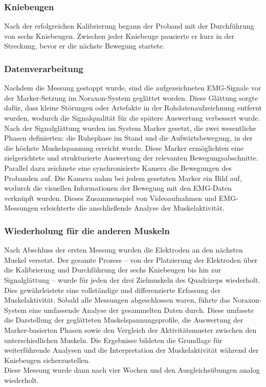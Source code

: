 \subsubsection{Kniebeugen}
Nach der erfolgreichen Kalibrierung begann der Proband mit der Durchführung von sechs Kniebeugen. Zwischen jeder Kniebeuge pausierte er kurz in der Streckung, bevor er die nächste Bewegung startete.
\subsubsection{Datenverarbeitung}
Nachdem die Messung gestoppt wurde, sind die aufgezeichneten EMG-Signale vor der Marker-Setzung im Noraxon-System geglättet worden. Diese Glättung sorgte dafür, dass kleine Störungen oder Artefakte in der Rohdatenaufzeichnung entfernt wurden, wodurch die Signalqualität für die spätere Auswertung verbessert wurde.\\
Nach der Signalglättung wurden im System Marker gesetzt, die zwei wesentliche Phasen definierten: die Ruhephase im Stand und die Aufwärtsbewegung, in der die höchste Muskelspannung erreicht wurde. Diese Marker ermöglichten eine zielgerichtete und strukturierte Auswertung der relevanten Bewegungsabschnitte.
Parallel dazu zeichnete eine synchronisierte Kamera die Bewegungen des Probanden auf. Die Kamera nahm bei jedem gesetzten Marker ein Bild auf, wodurch die visuellen Informationen der Bewegung mit den EMG-Daten verknüpft wurden. Dieses Zusammenspiel von Videoaufnahmen und EMG-Messungen erleichterte die anschließende Analyse der Muskelaktivität.
\subsubsection{Wiederholung für die anderen Muskeln}
Nach Abschluss der ersten Messung wurden die Elektroden an den nächsten Muskel versetzt. Der gesamte Prozess – von der Platzierung der Elektroden über die Kalibrierung und Durchführung der sechs Kniebeugen bis hin zur Signalglättung – wurde für jeden der drei Zielmuskeln des Quadrizeps wiederholt. Dies gewährleistete eine vollständige und differenzierte Erfassung der Muskelaktivität.
Sobald alle Messungen abgeschlossen waren, führte das Noraxon-System eine umfassende Analyse der gesammelten Daten durch. Diese umfasste die Darstellung der geglätteten Muskelspannungsprofile, die Auswertung der Marker-basierten Phasen sowie den Vergleich der Aktivitätsmuster zwischen den unterschiedlichen Muskeln. Die Ergebnisse bildeten die Grundlage für weiterführende Analysen und die Interpretation der Muskelaktivität während der Kniebeugen sicherzustellen.\\
Diese Messung wurde dann nach vier Wochen und den Ausgleichsübungen analog wiederholt. 

